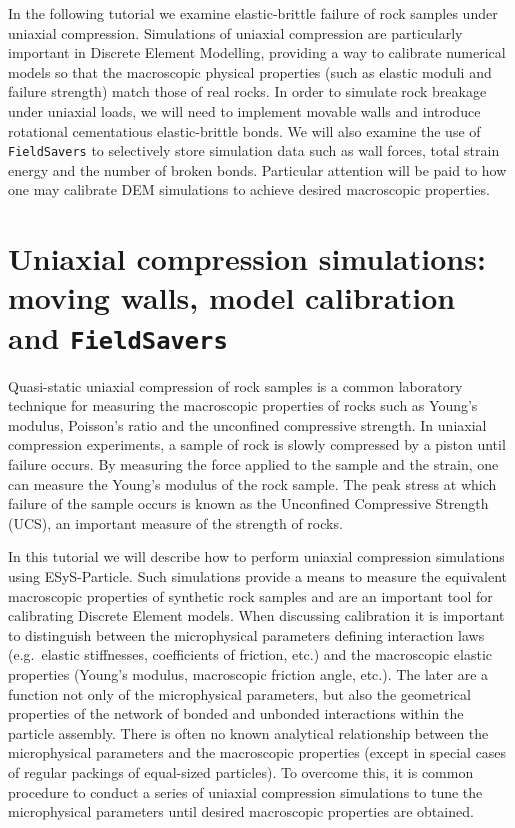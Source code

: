 In the following tutorial we examine elastic-brittle failure of rock samples under uniaxial compression. Simulations of uniaxial compression are particularly important in Discrete Element Modelling, providing a way to calibrate numerical models so that the macroscopic physical properties (such as elastic moduli and failure strength) match those of real rocks. In order to simulate rock breakage under uniaxial loads, we will need to implement movable walls and introduce rotational cementatious elastic-brittle bonds. We will also examine the use of \texttt{FieldSavers} to selectively store simulation data such as wall forces, total strain energy and the number of broken bonds. Particular attention will be paid to how one may calibrate DEM simulations to achieve desired macroscopic properties. 

\newpage
\section{Uniaxial compression simulations: moving walls, model calibration and \texttt{FieldSavers}}

Quasi-static uniaxial compression of rock samples is a common laboratory technique for measuring the macroscopic properties of rocks such as Young's modulus, Poisson's ratio and the unconfined compressive strength. In uniaxial compression experiments, a sample of rock is slowly compressed by a piston until failure occurs. By measuring the force applied to the sample and the strain, one can measure the Young's modulus of the rock sample. The peak stress at which failure of the sample occurs is known as the Unconfined Compressive Strength (UCS), an important measure of the strength of rocks. 

In this tutorial we will describe how to perform uniaxial compression simulations using ESyS-Particle. Such simulations provide a means to measure the equivalent macroscopic properties of synthetic rock samples and are an important tool for calibrating Discrete Element models. When discussing calibration it is important to distinguish between the microphysical parameters defining interaction laws (e.g.\ elastic stiffnesses, coefficients of friction, etc.) and the macroscopic elastic properties (Young's modulus, macroscopic friction angle, etc.). The later are a function not only of the microphysical parameters, but also the geometrical properties of the network of bonded and unbonded interactions within the particle assembly. There is often no known analytical relationship between the microphysical parameters and the macroscopic properties (except in special cases of regular packings of equal-sized particles). To overcome this, it is common procedure to conduct a series of uniaxial compression simulations to 
tune the microphysical parameters until desired macroscopic properties are obtained.

